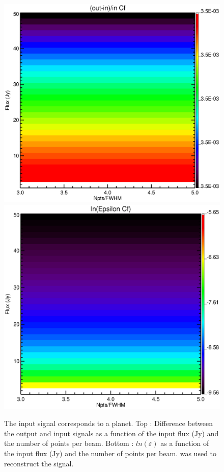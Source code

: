 \begin{figure}[h]
\center
	\includegraphics[scale=0.5]{Figures/diff_cf_planet.eps}
	\includegraphics[scale=0.5]{Figures/epsilon_cf_planet.eps}
	\caption{The input signal corresponds to a planet. Top : Difference between the output and input signals as a function of the input flux (Jy) and the number of points per beam. Bottom : $ln(\varepsilon)$ as a function of the input flux (Jy) and the number of points per beam. \cf was used to reconstruct the signal.}
	\label{fig:epsilon-planet}
\end{figure}

